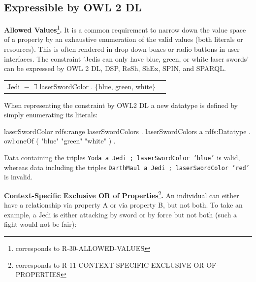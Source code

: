 \documentclass{llncs}
\newcommand{\ms}[1]{\texttt{#1}}
\newenvironment{DL}{
  \begin{tabular}{r l}

}{
  \end{tabular}
  \linebreak
}
\begin{document}
\subsection{Expressible by OWL 2 DL}
\label{sec:rdf-validation-requirements-without-reasoning-2}

\textbf{Allowed Values}\footnote{corresponds to R-30-ALLOWED-VALUES}\textbf{.}
It is a common requirement to narrow down the value space of a property by an exhaustive enumeration of the valid values (both literals or resources). This is often rendered in drop down boxes or radio buttons in user interfaces. 
The constraint 'Jedis can only have blue, green, or white laser swords' can be expressed by OWL 2 DL, DSP, ReSh, ShEx, SPIN, and SPARQL.
\begin{center}
\begin{DL}
Jedi $\equiv$ $\exists$ laserSwordColor . \{blue, green, white\} \\
\end{DL}
\end{center}
%

When representing the constraint by OWL2 DL a new datatype is defined by simply enumerating its literals:

\begin{ex}
laserSwordColor rdfs:range laserSwordColors . 
laserSwordColors
    a rdfs:Datatype .
    owl:oneOf ( "blue" "green" "white" ) .
\end{ex}

Data containing the triples \ms{Yoda a Jedi ; laserSwordColor 'blue'} is valid, 
whereas data including the triples \ms{DarthMaul a Jedi ; laserSwordColor 'red'} is invalid.

\textbf{Context-Specific Exclusive OR of Properties}\footnote{corresponds to  R-11-CONTEXT-SPECIFIC-EXCLUSIVE-OR-OF-PROPERTIES}\textbf{.}
An individual can either have a relationship via property A or via property B, but not both.
To take an example, a Jedi is either attacking by sword or by force but not both (such a fight would not be fair):
\end{document}
